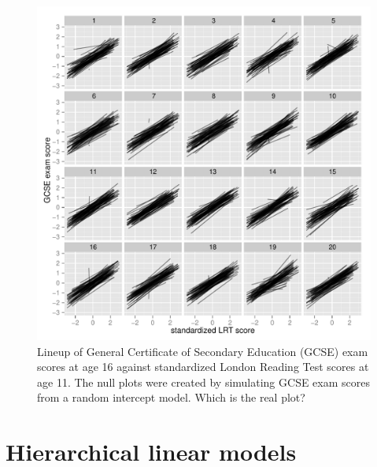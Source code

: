 \documentclass{article} %
\begin{document}
\begin{figure}
	\centering
	\includegraphics[width=\textwidth]{normexam_fanned_lineup19.pdf}
	\caption{\label{fig:fanned} Lineup of General Certificate of Secondary Education (GCSE) exam scores at age 16 against standardized London Reading Test scores at age 11. The null plots were created by simulating GCSE exam scores from a random intercept model. Which is the real plot?}
\end{figure}

\section{Hierarchical linear models}\label{sec:hlms}
\end{document}
